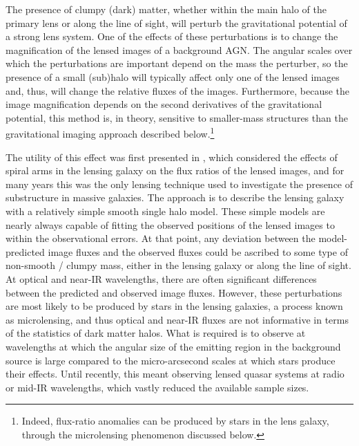 \vspace{1em} 

The presence of clumpy (dark) matter, whether within the main halo of the primary lens or along the line of sight, will perturb the gravitational potential of a strong lens system.
One of the effects of these perturbations is to change the magnification of the lensed images of a background AGN.
The angular scales over which the perturbations are important depend on the mass the perturber, so the presence of a small (sub)halo will typically affect only one of the lensed images and, thus, will change the relative fluxes of the images.
Furthermore, because the image magnification depends on the second derivatives of the gravitational potential, this method is, in theory, sensitive to smaller-mass structures than the gravitational imaging approach described below.\footnote{Indeed, flux-ratio anomalies can be produced by stars in the lens galaxy, through the microlensing phenomenon discussed below.}

The utility of this effect was first presented in \citet{Mao:1998aa}, which considered the effects of spiral arms in the lensing galaxy on the flux ratios of the lensed images, and for many years this was the only lensing technique used to investigate the presence of substructure in massive galaxies.
The approach is to describe the lensing galaxy with a relatively simple smooth single halo model.
These simple models are nearly always capable of fitting the observed positions of the lensed images to within the observational errors.
At that point, any deviation between the model-predicted image fluxes and the observed fluxes could be ascribed to some type of non-smooth / clumpy mass, either in the lensing galaxy or along the line of sight.
At optical and near-IR wavelengths, there are often significant differences between the predicted and observed image fluxes.
However, these perturbations are most likely to be produced by stars in the lensing galaxies, a process known as microlensing, and thus optical and near-IR fluxes are not informative in terms of the statistics of dark matter halos.
What is required is to observe at wavelengths at which the angular size of the emitting region in the background source is large compared to the micro-arcsecond scales at which stars produce their effects.  
Until recently, this meant observing lensed quasar systems at radio or mid-IR wavelengths, which vastly reduced the available sample sizes.

